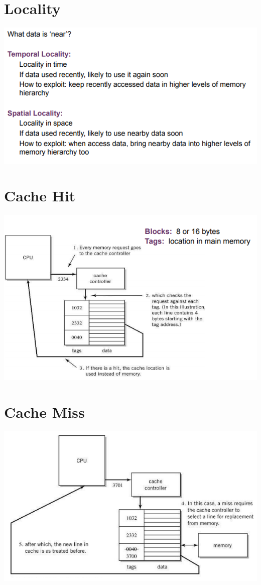 \documentclass{article}[18pt]
\begin{document}
\section{Locality}
\begin{center}
	\includegraphics[scale=0.7]{locality}
\end{center}
\section{Cache Hit}
\begin{center}
	\includegraphics[scale=0.7]{cache-hit}
\end{center}
\section{Cache Miss}
\begin{center}
	\includegraphics[scale=0.7]{cache-miss}
\end{center}
\end{document}
